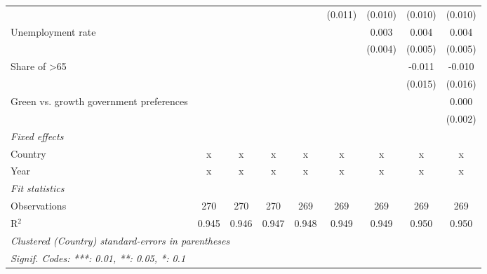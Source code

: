 \begin{table}[htbp]
\begin{tabular}{lcccccccc}
                                                            &         &         &             &             & (0.011)      & (0.010)      & (0.010)      & (0.010)\\   
      Unemployment rate                                     &         &         &             &             &              & 0.003        & 0.004        & 0.004\\   
                                                            &         &         &             &             &              & (0.004)      & (0.005)      & (0.005)\\   
      Share of >65                                          &         &         &             &             &              &              & -0.011       & -0.010\\   
                                                            &         &         &             &             &              &              & (0.015)      & (0.016)\\   
      Green vs. growth government preferences               &         &         &             &             &              &              &              & 0.000\\   
                                                            &         &         &             &             &              &              &              & (0.002)\\   
      \emph{Fixed effects}\\
      Country                                               & x       & x       & x           & x           & x            & x            & x            & x\\  
      Year                                                  & x       & x       & x           & x           & x            & x            & x            & x\\  
      \midrule \emph{Fit statistics}\\
      Observations                                          & 270     & 270     & 270         & 269         & 269          & 269          & 269          & 269\\  
      R$^2$                                                 & 0.945   & 0.946   & 0.947       & 0.948       & 0.949        & 0.949        & 0.950        & 0.950\\  
      \midrule
      \multicolumn{9}{l}{\emph{Clustered (Country) standard-errors in parentheses}}\\
      \multicolumn{9}{l}{\emph{Signif. Codes: ***: 0.01, **: 0.05, *: 0.1}}\\
   \end{tabular}
\end{table}


